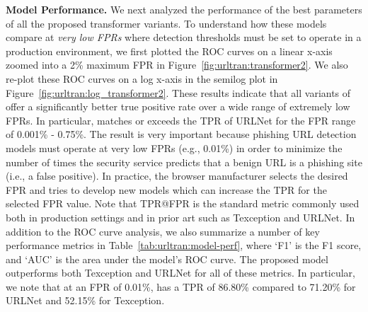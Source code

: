 \noindent\textbf{Model Performance.}
We next analyzed the performance of the best parameters of all the proposed transformer variants.
To understand how these models compare at \textit{very low FPRs} where detection thresholds must be set to operate in a production environment, we first plotted the ROC curves on a linear x-axis zoomed into a 2\% maximum FPR in Figure~\ref{fig:urltran:transformer2}.
We also re-plot these ROC curves on a log x-axis in the semilog plot in Figure~\ref{fig:urltran:log_transformer2}.
These results indicate that all variants of \URLTranSys offer a significantly better
true positive rate over a wide range of extremely low FPRs. In particular, \URLTranSys matches or exceeds the TPR of URLNet for the FPR range of 0.001\% - 0.75\%.
The result is very important because phishing URL detection models must operate at very low FPRs (e.g., 0.01\%) in order to minimize the number of times the security service predicts that a benign URL is a phishing site (i.e., a false positive). In practice, the browser manufacturer selects the desired FPR and tries to develop new models which can increase the TPR for the selected FPR value.
Note that TPR@FPR is the standard metric commonly used both in production settings and in prior art such as Texception and URLNet.
In addition to the ROC curve analysis, we also summarize a number of key performance metrics in Table~\ref{tab:urltran:model-perf}, where `F1' is the F1 score, and `AUC' is the area under the model's ROC curve.
The proposed \URLTranSys model outperforms both Texception and URLNet for all of these metrics.
In particular, we note that  at an FPR
of 0.01\%, \URLTranSysb has a
TPR of 86.80\% compared to 71.20\% for URLNet and 52.15\% for Texception.

\begin{table}[ht]
\begin{center}
\end{center}
\caption {Comparison of different performance metrics for \URLTranSys and the two baseline models.}
\label{tab:urltran:model-perf}
\end{table}


